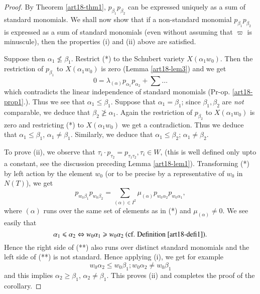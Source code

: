 \begin{proof}
By Theorem \ref{art18-thm1}, $p_{\beta_1} p_{\beta_2}$ can be expressed uniquely as a sum of standard monomials. We shall now show that if a non-standard monomial $p_{\beta_1} p_{\beta_2}$ is expressed as a sum of standard monomials (even without assuming that $\varpi$ is minuscule), then the properties (i) and (ii) above are satisfied.

Suppose then $\alpha_1 \not\leqslant \beta_1$. Restrict (*) to the Schubert variety $X(\alpha_1 w_0)$. Then the restriction of $p_{\beta_1}$ to $X(\alpha_1 w_0)$ is zero (\cf Lemma \ref{art18-lem3}) and we get
$$
0 = \lambda_{(\alpha)} p_{\alpha_1} p_{\alpha_2} + \sum \ldots 
$$
which contradicts the linear independence of standard monomials (\cf Pr-op. \ref{art18-prop1}.). Thus we see that $\alpha_1 \leqslant \beta_1$. Suppose that $\alpha_1 = \beta_1$; since $\beta_1, \beta_2$ are { \em not } comparable, we deduce that $\beta_2 \not\geqslant \alpha_1$. Again the restriction of $p_{\beta_2}$ to $X(\alpha_1 w_0)$ is zero and restricting (*) to $X(\alpha_1 w_0)$ we get a contradiction. Thus we deduce that $\alpha_1 \leqslant \beta_1$, $\alpha_1 \neq \beta_1$. Similarly, we deduce that $\alpha_1 \leqslant \beta_2$; $\alpha_1 \neq \beta_2$.

To prove (ii), we observe that $\tau_i \cdot p_{\tau_2} = p_{\tau_1 \tau_2}, \tau_i \in W$, (this is well defined only upto a constant, see the discussion preceding Lemma \ref{art18-lem1}). Transforming (*) by left action by the element $w_0$ (or to be precise by a representative of $w_0$ in $N(T)$), we get 
\begin{equation*}
p_{w_0 \beta_1} p_{w_0 \beta_2} = \sum\limits_{(\alpha) \in I^2} \mu_{(\alpha)} p_{w_0 \alpha_2} p_{w_0 \alpha_1}, 
\tag{**}
\end{equation*}
where $(\alpha)$ runs over the same set of elements as in (*) and $\mu_{(\alpha)} \neq 0$. We see easily that
$$
\alpha_1 \leqslant \alpha_2 \Leftrightarrow   w_0 \alpha_1 \geqslant  w_0 \alpha_2 \text{~~ ({cf.}\kern.3emDefinition \ref{art18-defi1}).}
$$
Hence the right side of (**) also runs over distinct standard monomials and the left side of (**) is not standard. Hence applying (i), we get for example
$$
w_0 \alpha_2 \leqslant w_0\beta_1; w_0  \alpha_2 \neq w_0 \beta_1
$$
and this implies $\alpha_2 \geqslant \beta_1$, $\alpha_2 \neq \beta_1$. This proves (ii) and completes the proof of the corollary.
\end{proof}

